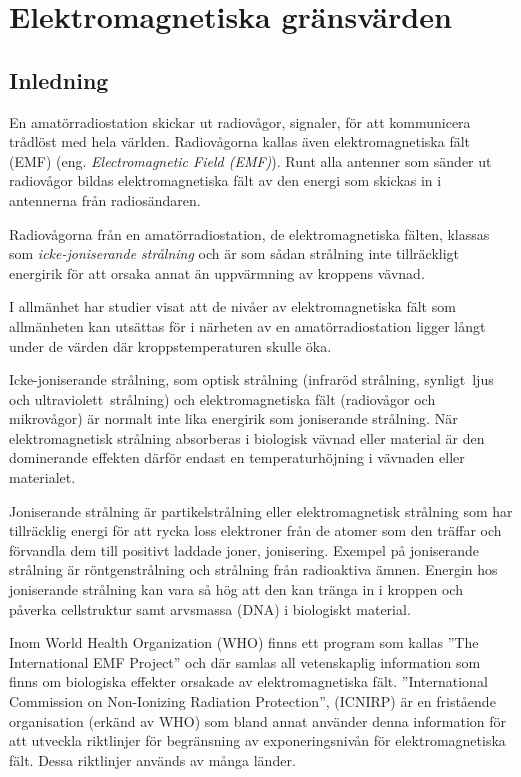 \chapter[EMF gränsvärden]{Elektromagnetiska gränsvärden}
\label{EMF}

\section{Inledning}
En amatörradiostation skickar ut radiovågor, signaler, för att kommunicera
trådlöst med hela världen.
Radiovågorna kallas även elektromagnetiska fält (EMF)
(eng. \emph{Electromagnetic Field (EMF)}).
Runt alla antenner som sänder ut radiovågor bildas elektromagnetiska fält av den
energi som skickas in i antennerna från radiosändaren.

Radiovågorna från en amatörradiostation, de elektromagnetiska fälten, klassas
som \emph{icke-joniserande strålning} och är som sådan strålning inte
tillräckligt energirik för att orsaka annat än uppvärmning av kroppens vävnad.

I allmänhet har studier visat att de nivåer av elektromagnetiska fält som
allmänheten kan utsättas för i närheten av en amatörradiostation ligger långt
under de värden där kroppstemperaturen skulle öka.

Icke-joniserande strålning, som optisk strålning (infraröd strålning,
synligt~ljus och ultraviolett~strålning) och elektromagnetiska fält (radiovågor
och mikrovågor) är normalt inte lika energirik som joniserande strålning.
När elektromagnetisk strålning absorberas i biologisk vävnad eller material är
den dominerande effekten därför endast en temperaturhöjning i vävnaden eller
materialet.

Joniserande strålning är partikelstrålning eller elektromagnetisk strålning som
har tillräcklig energi för att rycka loss elektroner från de atomer som den
träffar och förvandla dem till positivt laddade joner, jonisering.
Exempel på joniserande strålning är röntgenstrålning och strålning från
radioaktiva ämnen.
Energin hos joniserande strålning kan vara så hög att den kan tränga in i
kroppen och påverka cellstruktur samt arvsmassa (DNA) i biologiskt material.

Inom World Health Organization (WHO) finns ett program som kallas
''The International EMF Project'' och där samlas all vetenskaplig
information som finns om biologiska effekter orsakade av elektromagnetiska fält.
''International Commission on Non-Ionizing Radiation Protection'', (ICNIRP)
är en fristående organisation (erkänd av WHO) som bland annat använder denna
information för att utveckla riktlinjer för begränsning av exponeringsnivån för
elektromagnetiska fält.
Dessa riktlinjer används av många länder.

